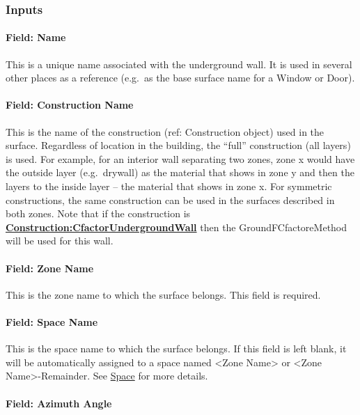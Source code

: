 \subsubsection{Inputs}\label{inputs-6-029}

\paragraph{Field: Name}\label{field-name-2-039}

This is a unique name associated with the underground wall. It is used in several other places as a reference (e.g.~as the base surface name for a Window or Door).

\paragraph{Field: Construction Name}\label{field-construction-name-2-001}

This is the name of the construction (ref: Construction object) used in the surface. Regardless of location in the building, the ``full'' construction (all layers) is used. For example, for an interior wall separating two zones, zone x would have the outside layer (e.g.~drywall) as the material that shows in zone y and then the layers to the inside layer -- the material that shows in zone x. For symmetric constructions, the same construction can be used in the surfaces described in both zones. Note that if the construction is \textbf{\hyperref[constructioncfactorundergroundwall]{Construction:CfactorUndergroundWall}} then the GroundFCfactoreMethod will be used for this wall.

\paragraph{Field: Zone Name}\label{field-zone-name-2-007}

This is the zone name to which the surface belongs. This field is required.

\paragraph{Field: Space Name}\label{field-space-name-2-007}

This is the space name to which the surface belongs. If this field is left blank, it will be automatically assigned to a space named <Zone Name> or <Zone Name>-Remainder. See \hyperref[space]{Space} for more details.

\paragraph{Field: Azimuth Angle}\label{field-azimuth-angle-2}

